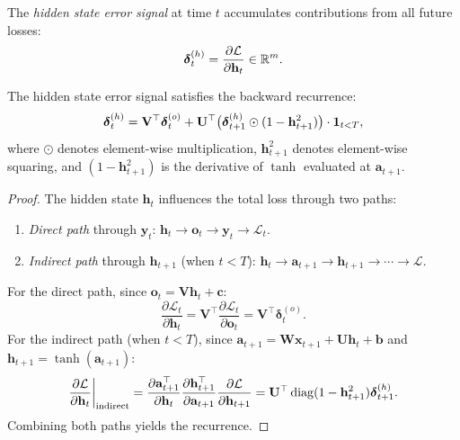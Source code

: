 \documentclass[11pt,a4paper]{article}
\begin{document}
\begin{definition}
\label{def:hidden-error}
The \emph{hidden state error signal} at time $t$ accumulates
contributions from all future losses:
\begin{equation}
  \boldsymbol{\delta}_t^{(h)} = \frac{\partial \mathcal{L}}
    {\partial \mathbf{h}_t} \in \mathbb{R}^m.
  \label{eq:hidden-error}
\end{equation}
\end{definition}

\begin{theorem}
\label{thm:hidden-error-recurrence}
The hidden state error signal satisfies the backward recurrence:
\begin{equation}
  \boldsymbol{\delta}_t^{(h)} = \mathbf{V}^\top
    \boldsymbol{\delta}_t^{(o)} + \mathbf{U}^\top
    \bigl(\boldsymbol{\delta}_{t+1}^{(h)} \odot
    (1 - \mathbf{h}_{t+1}^2)\bigr) \cdot \mathbf{1}_{t < T},
  \label{eq:hidden-recurrence}
\end{equation}
where $\odot$ denotes element-wise multiplication, $\mathbf{h}_{t+1}^2$
denotes element-wise squaring, and $(1 - \mathbf{h}_{t+1}^2)$ is the
derivative of $\tanh$ evaluated at $\mathbf{a}_{t+1}$.
\end{theorem}

\begin{proof}
The hidden state $\mathbf{h}_t$ influences the total loss through two
paths:
\begin{enumerate}[nosep]
  \item \emph{Direct path} through $\mathbf{y}_t$:
    $\mathbf{h}_t \to \mathbf{o}_t \to \mathbf{y}_t \to \mathcal{L}_t$.
  \item \emph{Indirect path} through $\mathbf{h}_{t+1}$ (when $t < T$):
    $\mathbf{h}_t \to \mathbf{a}_{t+1} \to \mathbf{h}_{t+1} \to
    \cdots \to \mathcal{L}$.
\end{enumerate}
For the direct path, since $\mathbf{o}_t = \mathbf{V}\mathbf{h}_t +
\mathbf{c}$:
\[
  \frac{\partial \mathcal{L}_t}{\partial \mathbf{h}_t}
    = \mathbf{V}^\top \frac{\partial \mathcal{L}_t}
      {\partial \mathbf{o}_t}
    = \mathbf{V}^\top \boldsymbol{\delta}_t^{(o)}.
\]
For the indirect path (when $t < T$), since
$\mathbf{a}_{t+1} = \mathbf{W}\mathbf{x}_{t+1} +
\mathbf{U}\mathbf{h}_t + \mathbf{b}$ and
$\mathbf{h}_{t+1} = \tanh(\mathbf{a}_{t+1})$:
\[
  \frac{\partial \mathcal{L}}{\partial \mathbf{h}_t}\bigg|_{\text{indirect}}
    = \frac{\partial \mathbf{a}_{t+1}^\top}{\partial \mathbf{h}_t}
      \frac{\partial \mathbf{h}_{t+1}^\top}{\partial \mathbf{a}_{t+1}}
      \frac{\partial \mathcal{L}}{\partial \mathbf{h}_{t+1}}
    = \mathbf{U}^\top \operatorname{diag}(1 - \mathbf{h}_{t+1}^2)
      \boldsymbol{\delta}_{t+1}^{(h)}.
\]
Combining both paths yields the recurrence.
\end{proof}
\end{document}
